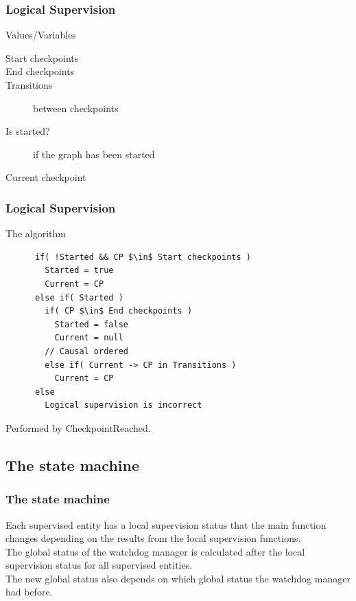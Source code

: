 \documentclass{beamer}
\begin{document}
\begin{frame}
  \frametitle{Logical Supervision}
  \begin{block}{Values/Variables}
    \begin{description}
      \item[Start checkpoints]
      \item[End checkpoints]
      \item[Transitions] between checkpoints
      \item[Is started?] if the graph has been started
      \item[Current checkpoint]
    \end{description}
  \end{block}
\end{frame}

\begin{frame}[fragile]
  \frametitle{Logical Supervision}
  \begin{block}{The algorithm}
    \begin{lstlisting}
      if( !Started && CP $\in$ Start checkpoints )
        Started = true
        Current = CP
      else if( Started )
        if( CP $\in$ End checkpoints )
          Started = false
          Current = null
        // Causal ordered
        else if( Current -> CP in Transitions )
          Current = CP
      else
        Logical supervision is incorrect
    \end{lstlisting}
  \end{block}
  Performed by CheckpointReached.
\end{frame}

\subsection{The state machine}

\begin{frame}
  \frametitle{The state machine}
  Each supervised entity has a local supervision status that the main
  function changes depending on the results from the local supervision
  functions.\\

  The global status of the watchdog manager is calculated after the
  local supervision status for all supervised entities.\\

  The new global status also depends on which global status the
  watchdog manager had before.
\end{frame}
\end{document}
